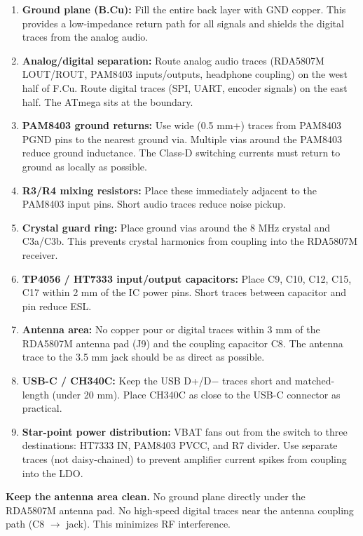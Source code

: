 \documentclass[a4paper,11pt]{article}
\renewcommand*{\,}{ }%
\begin{document}
\begin{enumerate}
    \item \textbf{Ground plane (B.Cu):} Fill the entire back layer with GND copper. This provides a low-impedance return path for all signals and shields the digital traces from the analog audio.
    \item \textbf{Analog/digital separation:} Route analog audio traces (RDA5807M LOUT/ROUT, PAM8403 inputs/outputs, headphone coupling) on the west half of F.Cu. Route digital traces (SPI, UART, encoder signals) on the east half. The ATmega sits at the boundary.
    \item \textbf{PAM8403 ground returns:} Use wide (0.5\,mm+) traces from PAM8403 PGND pins to the nearest ground via. Multiple vias around the PAM8403 reduce ground inductance. The Class-D switching currents must return to ground as locally as possible.
    \item \textbf{R3/R4 mixing resistors:} Place these immediately adjacent to the PAM8403 input pins. Short audio traces reduce noise pickup.
    \item \textbf{Crystal guard ring:} Place ground vias around the 8\,MHz crystal and C3a/C3b. This prevents crystal harmonics from coupling into the RDA5807M receiver.
    \item \textbf{TP4056 / HT7333 input/output capacitors:} Place C9, C10, C12, C15, C17 within 2\,mm of the IC power pins. Short traces between capacitor and pin reduce ESL.
    \item \textbf{Antenna area:} No copper pour or digital traces within 3\,mm of the RDA5807M antenna pad (J9) and the coupling capacitor C8. The antenna trace to the 3.5\,mm jack should be as direct as possible.
    \item \textbf{USB-C / CH340C:} Keep the USB D+/D$-$ traces short and matched-length (under 20\,mm). Place CH340C as close to the USB-C connector as practical.
    \item \textbf{Star-point power distribution:} VBAT fans out from the switch to three destinations: HT7333 IN, PAM8403 PVCC, and R7 divider. Use separate traces (not daisy-chained) to prevent amplifier current spikes from coupling into the LDO.
\end{enumerate}

\begin{warningbox}
\textbf{Keep the antenna area clean.} No ground plane directly under the RDA5807M antenna pad. No high-speed digital traces near the antenna coupling path (C8 $\rightarrow$ jack). This minimizes RF interference.
\end{warningbox}
\end{document}
